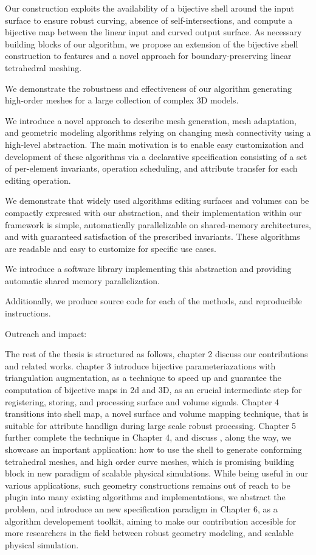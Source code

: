 Our construction exploits the availability of a bijective shell around the input surface to ensure robust curving, absence of self-intersections, and compute a bijective map between the linear input and curved output surface. As necessary building blocks of our algorithm, we propose an extension of the bijective shell construction to features and a novel approach for boundary-preserving linear tetrahedral meshing.

We demonstrate the robustness and effectiveness of our algorithm generating high-order meshes for a large collection of complex 3D models.


We introduce a novel approach to describe mesh generation, mesh adaptation, and geometric modeling algorithms relying on changing mesh connectivity using a high-level abstraction. The main motivation is to enable easy customization and development of these algorithms via a declarative specification consisting of a set of per-element invariants, operation scheduling, and attribute transfer for each editing operation.

We demonstrate that widely used algorithms editing surfaces and volumes can be compactly expressed with our abstraction, and their implementation within our framework is simple, automatically parallelizable on shared-memory architectures, and with guaranteed satisfaction of the prescribed invariants. These algorithms are readable and easy to customize for specific use cases.

We introduce a software library implementing this abstraction and providing automatic shared memory parallelization.

Additionally, we produce source code for each of the methods, and reproducible instructions.

% 
Outreach and impact:

% 
The rest of the thesis is structured as follows,
chapter 2 discuss our contributions and related works.
chapter 3 introduce bijective parameteriazations with triangulation augmentation, as a technique to speed up and guarantee the computation of bijective maps in 2d and 3D, as an crucial intermediate step for registering, storing, and processing surface and volume signals.
Chapter 4 transitions into shell map, a novel surface and volume mapping technique, that is suitable for attribute handlign during large scale robust processing. 
Chapter 5 further complete the technique in Chapter 4, and discuss , along the way, we showcase an important application: how to use the shell to generate conforming tetrahedral meshes, and high order curve meshes, which is promising building block in new paradigm of scalable physical simulations. 
While being useful in our various applications, such geometry constructions remains out of reach to be plugin into many existing algorithms and implementations, we abstract the problem, and introduce an new specification paradigm in Chapter 6, as a algorithm developement toolkit, aiming to make our contribution accesible for more researchers in the field between robust geometry modeling, and scalable physical simulation.